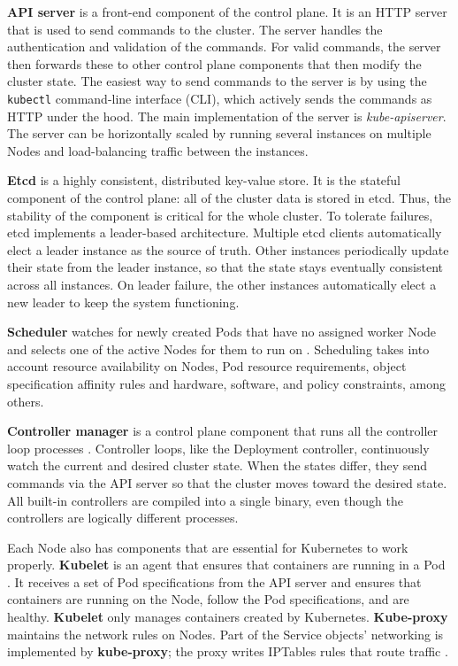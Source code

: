 \documentclass[english, 12pt, a4paper, sci, utf8, a-2b, online]{aaltothesis}
\begin{document}
\textbf{API server} is a front-end component of the control plane.
It is an HTTP server that is used to send commands to the cluster.
The server handles the authentication and validation of the commands.
For valid commands, the server then forwards these to other control plane components that then modify the cluster state.
The easiest way to send commands to the server is by using the \lstinline{kubectl} command-line interface (CLI), which actively sends the commands as HTTP under the hood.
The main implementation of the server is \emph{kube-apiserver}.
The server can be horizontally scaled by running several instances on multiple Nodes and load-balancing traffic between the instances.

\textbf{Etcd} \cite{etcd} is a highly consistent, distributed key-value store.
It is the stateful component of the control plane: all of the cluster data is stored in etcd.
Thus, the stability of the component is critical for the whole cluster.
To tolerate failures, etcd implements a leader-based architecture.
Multiple etcd clients automatically elect a leader instance as the source of truth.
Other instances periodically update their state from the leader instance, so that the state stays eventually consistent across all instances.
On leader failure, the other instances automatically elect a new leader to keep the system functioning.

\textbf{Scheduler} watches for newly created Pods that have no assigned worker Node and selects one of the active Nodes for them to run on \cite{k8s-docs-control-plane}.
Scheduling takes into account resource availability on Nodes, Pod resource requirements, object specification affinity rules and hardware, software, and policy constraints, among others.

\textbf{Controller manager} is a control plane component that runs all the controller loop processes \cite{k8s-docs-control-plane}.
Controller loops, like the Deployment controller, continuously watch the current and desired cluster state.
When the states differ, they send commands via the API server so that the cluster moves toward the desired state.
All built-in controllers are compiled into a single binary, even though the controllers are logically different processes.

Each Node also has components that are essential for Kubernetes to work properly.
\textbf{Kubelet} is an agent that ensures that containers are running in a Pod \cite{k8s-docs-control-plane}.
It receives a set of Pod specifications from the API server and ensures that containers are running on the Node, follow the Pod specifications, and are healthy.
\textbf{Kubelet} only manages containers created by Kubernetes.
\textbf{Kube-proxy} maintains the network rules on Nodes.
Part of the Service objects' networking is implemented by \textbf{kube-proxy}; the proxy writes IPTables rules that route traffic \cite{cilium-proxy-free}.
\end{document}
